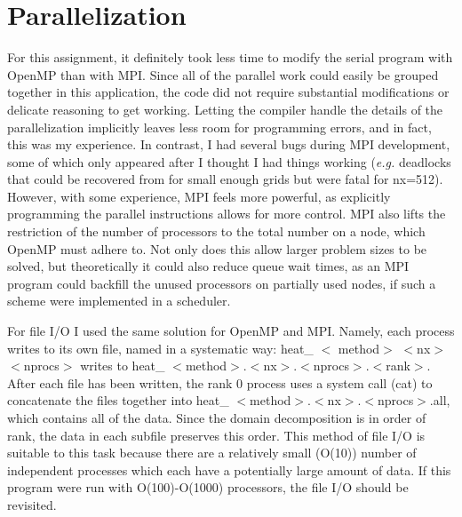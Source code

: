 \documentclass[11pt]{article}
\theoremstyle{plain}
\theoremstyle{definition}
\begin{document}
\section{Parallelization} 

For this assignment, it definitely took less time to modify the serial program with OpenMP than with MPI. Since all of the parallel work could easily be grouped together in this application, the code did not require substantial modifications or delicate reasoning to get working. Letting the compiler handle the details of the parallelization implicitly leaves less room for programming errors, and in fact, this was my experience. In contrast, I had several bugs during MPI development, some of which only appeared after I thought I had things working (\emph{e.g.} deadlocks that could be recovered from for small enough grids but were fatal for nx=512). However, with some experience, MPI feels more powerful, as explicitly programming the parallel instructions allows for more control. MPI also lifts the restriction of the number of processors to the total number on a node, which OpenMP must adhere to. Not only does this allow larger problem sizes to be solved, but theoretically it could also reduce queue wait times, as an MPI program could backfill the unused processors on partially used nodes, if such a scheme were implemented in a scheduler. 

For file I/O I used the same solution for OpenMP and MPI. Namely, each process writes to its own file, named in a systematic way: heat\_ $<$ method$>$ $<$nx$>$ $<$nprocs$>$ writes to heat\_ $<$method$>$.$<$nx$>$.$<$nprocs$>$.$<$rank$>$. After each file has been written, the rank 0 process uses a system call (cat) to concatenate the files together into heat\_ $<$method$>$.$<$nx$>$.$<$nprocs$>$.all, which contains all of the data. Since the domain decomposition is in order of rank, the data in each subfile preserves this order. This method of file I/O is suitable to this task because there are a relatively small (O(10)) number of independent processes which each have a potentially large amount of data. If this program were run with O(100)-O(1000) processors, the file I/O should be revisited. 
 
 
\end{document}
